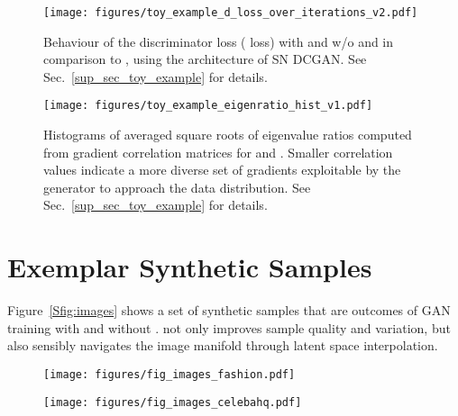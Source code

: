 \documentclass{article}
\begin{document}
\begin{center}
\begin{figure}[t!]
\begin{center}
		\texttt{[image: figures/toy\_example\_d\_loss\_over\_iterations\_v2.pdf]}
	\end{center}
	\vspace{-1em}
	\caption{\label{fig:toy_d_loss} Behaviour of the discriminator loss ( loss) with and w/o  and in comparison to , using the  architecture of SN DCGAN. See Sec.~\ref{sup_sec_toy_example} for details.} 
	\vspace{-1em}
\end{figure}
\begin{figure}[t!]\centering
	\texttt{[image: figures/toy\_example\_eigenratio\_hist\_v1.pdf]}
\caption{Histograms of averaged square roots of eigenvalue ratios computed from gradient correlation matrices for  and . Smaller correlation values indicate a more diverse set of gradients exploitable by the generator to approach the data distribution. See Sec.~\ref{sup_sec_toy_example} for details.}
	\label{fig:toy_hist}
\end{figure} 
\section{Exemplar Synthetic Samples}\label{sec:syn samples}
Figure~\ref{Sfig:images} shows a set of synthetic samples that are outcomes of GAN training with and without .  not only improves sample quality and variation, but also sensibly navigates the image manifold through latent space interpolation.

\begin{figure*}	
	\centering
	\begin{subfigure}{\textwidth}
	\texttt{[image: figures/fig\_images\_fashion.pdf]}
	\end{subfigure}	
	\begin{subfigure}{\textwidth}
	\texttt{[image: figures/fig\_images\_celebahq.pdf]}
	\end{subfigure}	
	\caption{Synthetic samples from training SN GAN on Fashion-MNIST () and SA GAN (sBN) on CELEBA-HQ () with and without using PA. In all cases, i.e., (a), (b), (c) and (d), the eight images per row are generated through polar-interpolation between two randomly sampled  and .}\label{Sfig:images}
\end{figure*}


\end{center}
\end{document}
